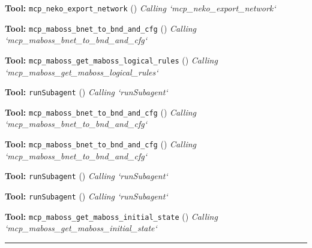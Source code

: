 \documentclass[11pt,a4paper]{article}
\begin{document}
\begin{toolokbox}
\textbf{Tool:} \texttt{mcp\_neko\_export\_network} (\checkmark)
\textit{Calling `mcp\_neko\_export\_network`}
\end{toolokbox}
\begin{toolokbox}
\textbf{Tool:} \texttt{mcp\_maboss\_bnet\_to\_bnd\_and\_cfg} (\checkmark)
\textit{Calling `mcp\_maboss\_bnet\_to\_bnd\_and\_cfg`}
\end{toolokbox}
\begin{toolokbox}
\textbf{Tool:} \texttt{mcp\_maboss\_get\_maboss\_logical\_rules} (\checkmark)
\textit{Calling `mcp\_maboss\_get\_maboss\_logical\_rules`}
\end{toolokbox}
\begin{toolokbox}
\textbf{Tool:} \texttt{runSubagent} (\checkmark)
\textit{Calling `runSubagent`}
\end{toolokbox}
\begin{toolokbox}
\textbf{Tool:} \texttt{mcp\_maboss\_bnet\_to\_bnd\_and\_cfg} (\checkmark)
\textit{Calling `mcp\_maboss\_bnet\_to\_bnd\_and\_cfg`}
\end{toolokbox}
\begin{toolokbox}
\textbf{Tool:} \texttt{mcp\_maboss\_bnet\_to\_bnd\_and\_cfg} (\checkmark)
\textit{Calling `mcp\_maboss\_bnet\_to\_bnd\_and\_cfg`}
\end{toolokbox}
\begin{toolokbox}
\textbf{Tool:} \texttt{runSubagent} (\checkmark)
\textit{Calling `runSubagent`}
\end{toolokbox}
\begin{toolokbox}
\textbf{Tool:} \texttt{runSubagent} (\checkmark)
\textit{Calling `runSubagent`}
\end{toolokbox}
\begin{toolokbox}
\textbf{Tool:} \texttt{mcp\_maboss\_get\_maboss\_initial\_state} (\checkmark)
\textit{Calling `mcp\_maboss\_get\_maboss\_initial\_state`}
\end{toolokbox}
\bigskip\hrule\bigskip
\end{document}
